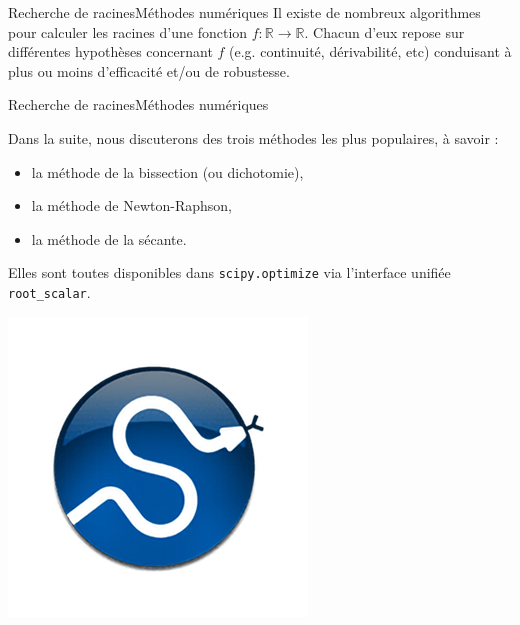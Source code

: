 \documentclass[usenames,dvipsnames,svgnames,10pt,aspectratio=169]{beamer}
\begin{document}
\begin{frame}[t, c]{Recherche de racines}{Méthodes numériques}
  Il existe de nombreux algorithmes pour calculer les racines d'une fonction $f : \mathbb{R} \to \mathbb{R}$.
  Chacun d'eux repose sur différentes hypothèses concernant $f$ (e.g. continuité, dérivabilité, etc) conduisant à plus ou moins d'efficacité et/ou de robustesse.
  \vspace{1cm}
\end{frame}


\begin{frame}[t, c, fragile]{Recherche de racines}{Méthodes numériques}
  \begin{minipage}{.68\textwidth}
    Dans la suite, nous discuterons des trois méthodes les plus populaires, à savoir :
    \begin{itemize}
    \item la méthode de la bissection (ou dichotomie),
    \item la méthode de Newton-Raphson,
    \item la méthode de la sécante.
    \end{itemize}

    \bigskip

    Elles sont toutes disponibles dans \verb+scipy.optimize+ via l'interface unifiée \verb+root_scalar+.
  \end{minipage}%
  \hfill
  \begin{minipage}{.28\textwidth}
    \centering
    \includegraphics[width=\textwidth]{scipy_logo}
  \end{minipage}
\end{frame}
\end{document}
